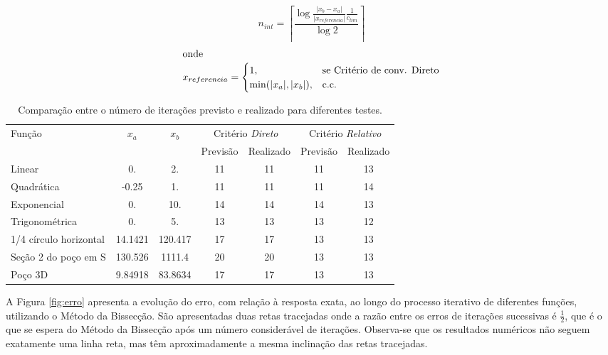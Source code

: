 \documentclass[final,5p]{elsarticle}
\numberwithin{equation}{section}
\begin{document}
    \begin{equation} \label{eq:nint}
        n_{int} = \left \lceil \frac{\log{\frac{|x_b-x_a|}{|x_{referencia}|}\frac{1}{c_{lim}}}}{\log{2}} \right \rceil
    \end{equation}
    \begin{align*}
        \intertext{onde}
        x_{referencia} = \begin{cases}
            1,&\text{se Critério de conv. Direto} \\
            \min(|x_a|,|x_b|),&\text{c.c. }  
        \end{cases}
    \end{align*}
    
    \begin{table} 
        \caption{Comparação entre o número de iterações previsto e realizado para diferentes testes.}
        \begin{tabular}{ l c c c c c c }
            \hline
            \multirow{2}{*}{Função} & \multirow{2}{*}{$x_a$} & \multirow{2}{*}{$x_b$} & \multicolumn{2}{c}{Critério \emph{Direto}} & \multicolumn{2}{c}{Critério \emph{Relativo}} \\
            &  &  & Previsão & Realizado & Previsão & Realizado \\
            \hline
            Linear & 0. & 2. & 11 & 11 & 11 & 13 \\
            Quadrática & -0.25 & 1. & 11 & 11 & 11 & 14 \\
            Exponencial & 0. & 10. & 14 & 14 & 14 & 13 \\
            Trigonométrica & 0. & 5. & 13 & 13 & 13 & 12 \\
            1/4 círculo horizontal & 14.1421 & 120.417 & 17 & 17 & 13 & 13 \\
            Seção 2 do poço em S & 130.526 & 1111.4 & 20 & 20 & 13 & 13 \\
            Poço 3D & 9.84918 & 83.8634 & 17 & 17 & 13 & 13 \\
            \hline
        \end{tabular}
        \label{table:iteracoes}
    \end{table}

    A Figura \ref{fig:erro} apresenta a evolução do erro, com relação à resposta exata, ao longo do processo iterativo de diferentes funções, utilizando o Método da Bissecção. São apresentadas duas retas tracejadas onde a razão entre os erros de iterações sucessivas é $\frac{1}{2}$, que é o que se espera do Método da Bissecção após um número considerável de iterações. Observa-se que os resultados numéricos não seguem exatamente uma linha reta, mas têm aproximadamente a mesma inclinação das retas tracejadas.
\end{document}
